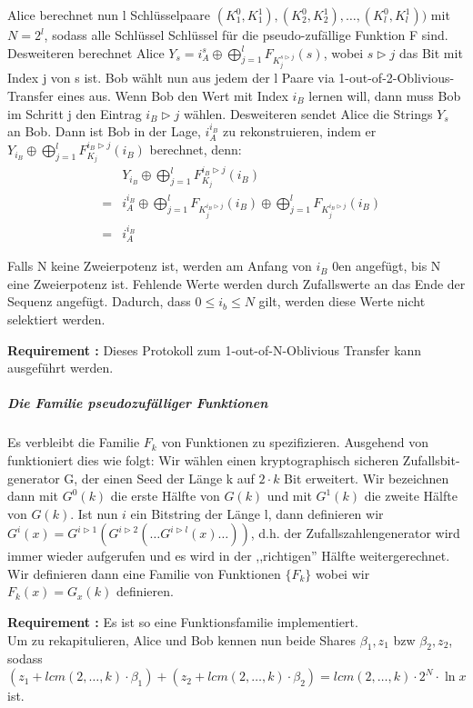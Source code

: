 \documentclass{article}
\newcounter{requirementscount}{}
\newcommand{\requirement}[1] {
        \addtocounter{requirementscount}{1}
        {\bf Requirement \therequirementscount:} #1\\
    }
\begin{document}
Alice berechnet nun l Schl\"usselpaare
\((K_1^0, K_1^1), (K_2^0, K_2^1), \dots, (K_l^0, K_l^1))\) mit \(N = 2^l\),
sodass alle Schl\"ussel Schl\"ussel f\"ur die pseudo-zuf\"allige Funktion F
sind. Desweiteren berechnet Alice 
\(Y_s = i_A^s \oplus \bigoplus_{j=1}^l F_{K_j^{s \rhd j}}(s)\), wobei \(s \rhd j\) das
Bit mit Index j von s ist. Bob w\"ahlt nun aus jedem der l Paare via
1-out-of-2-Oblivious-Transfer eines aus. 
Wenn Bob den Wert mit Index \(i_B\) lernen will, dann muss Bob im Schritt j
den Eintrag \(i_B \rhd j\) w\"ahlen. Desweiteren sendet Alice die Strings \(Y_s\) an Bob.
Dann ist Bob in der Lage, \(i_A^{i_B}\) zu rekonstruieren, indem er
\(Y_{i_B} \oplus \bigoplus_{j=1}^l F_{K_j}^{i_B \rhd j}(i_B)\) berechnet,
denn:
\begin{align*}
& & Y_{i_B} \oplus \bigoplus_{j=1}^l F_{K_j}^{i_B \rhd j}(i_B)\\
&=& i_A^{i_B} 
        \oplus \bigoplus_{j=1}^l F_{K_j^{i_B \rhd j}}(i_B) 
        \oplus \bigoplus_{j=1}^l F_{K_j^{i_B \rhd j}}(i_B)\\
&=& i_A^{i_B}
\end{align*}

Falls N keine Zweierpotenz ist, werden am Anfang von \(i_B\) 0en 
angef\"ugt, bis N eine Zweierpotenz ist. Fehlende Werte werden durch
Zufallswerte an das Ende der Sequenz angef\"ugt. Dadurch, dass
\(0 \leq i_b \leq N\) gilt, werden diese Werte nicht selektiert werden.\\
\requirement{Dieses Protokoll zum 1-out-of-N-Oblivious Transfer kann
ausgef\"uhrt werden.}

\subparagraph{Die Familie pseudozuf\"alliger Funktionen}
Es verbleibt die Familie \(F_k\) von Funktionen zu spezifizieren. Ausgehend von
\cite{constructrandom} funktioniert dies wie folgt: Wir w\"ahlen einen 
kryptographisch sicheren Zufallsbit-generator G, der einen Seed der L\"ange
k auf \(2\cdot k\) Bit erweitert. Wir bezeichnen dann mit \(G^0(k)\) die erste
H\"alfte von \(G(k)\) und mit \(G^1(k)\) die zweite H\"alfte von \(G(k)\). Ist
nun \(i\) ein Bitstring der L\"ange l, dann definieren wir 
\(G^i(x) = G^{i \rhd 1}(G^{i \rhd 2}(\dots G^{i \rhd l}(x) \dots))\), d.h. der
Zufallszahlengenerator wird immer wieder aufgerufen und es wird in der 
,,richtigen'' H\"alfte weitergerechnet. Wir definieren dann eine Familie 
von Funktionen \(\{F_k\}\) wobei wir \(F_k(x) = G_x(k)\) definieren.\\
\requirement{Es ist so eine Funktionsfamilie implementiert.}

Um zu rekapitulieren, Alice und Bob kennen nun beide Shares \(\beta_1, z_1\) bzw 
\(\beta_2, z_2\), sodass
\((z_1 + lcm(2,\dots,k)\cdot\beta_1) + (z_2 + lcm(2,\dots,k)\cdot\beta_2)
 = lcm(2,\dots,k)\cdot2^N\cdot\ln x\) ist.\\
\end{document}
